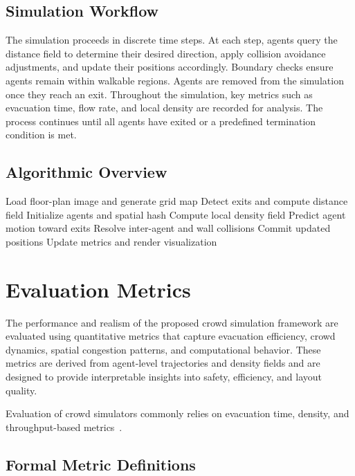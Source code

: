 \documentclass[conference]{IEEEtran}
\begin{document}
\subsection{\textbf{Simulation Workflow}}

The simulation proceeds in discrete time steps. At each step, agents query the
distance field to determine their desired direction, apply collision avoidance
adjustments, and update their positions accordingly. Boundary checks ensure
agents remain within walkable regions. Agents are removed from the simulation
once they reach an exit. Throughout the simulation, key metrics such as
evacuation time, flow rate, and local density are recorded for analysis. The
process continues until all agents have exited or a predefined termination
condition is met.

\subsection{Algorithmic Overview}

\begin{algorithmic}[1]
    \STATE Load floor-plan image and generate grid map
    \STATE Detect exits and compute distance field
    \STATE Initialize agents and spatial hash
    \STATE Compute local density field
    \STATE Predict agent motion toward exits
    \STATE Resolve inter-agent and wall collisions
    \STATE Commit updated positions
    \ENDFOR
    \STATE Update metrics and render visualization
    \ENDWHILE
\end{algorithmic}

\section{Evaluation Metrics}

The performance and realism of the proposed crowd simulation framework are
evaluated using quantitative metrics that capture evacuation efficiency, crowd
dynamics, spatial congestion patterns, and computational behavior. These
metrics are derived from agent-level trajectories and density fields and are
designed to provide interpretable insights into safety, efficiency, and layout
quality.

Evaluation of crowd simulators commonly relies on evacuation time, density, and
throughput-based
metrics~\cite{seyfried2005fundamental,hoogendoorn2004pedestrian}.

\subsection{\textbf{Formal Metric Definitions}}
\end{document}
